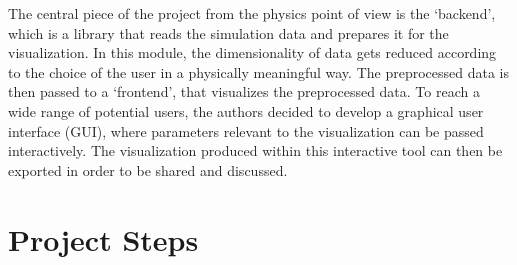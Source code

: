 The central piece of the project from the physics point of view is the `backend', which is a library that reads the simulation data and prepares it for the visualization. In this module, the dimensionality of data gets reduced according to the choice of the user in a physically meaningful way. The preprocessed data is then passed to a `frontend', that visualizes the preprocessed data. To reach a wide range of potential users, the authors decided to develop a graphical user interface (GUI), where parameters relevant to the visualization can be passed interactively. The visualization produced within this interactive tool can then be exported in order to be shared and discussed.




\section{Project Steps}
\label{sec:steps}

